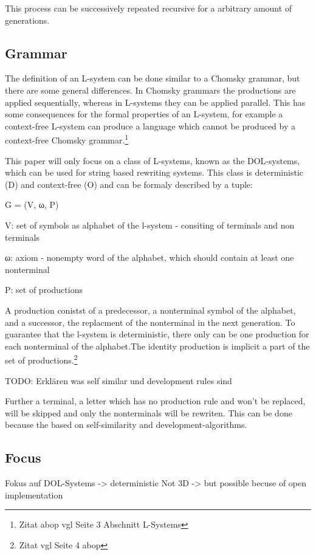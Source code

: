 \documentclass[english]{cpp-hmwk}
\begin{document}
This process can be successively repeated recursive for a arbitrary amount of generations.
\subsection{Grammar}
\label{section:grammar}
The definition of an L-system can be done similar to a Chomsky grammar, but there are some general differences. In Chomsky grammars the productions are applied sequentially, whereas in L-systems they can be applied parallel. This has some consequences for the formal properties of an L-system, for example a context-free L-system can produce a language which cannot be produced by a context-free Chomsky grammar.\footnote{Zitat abop vgl Seite 3  Abschnitt L-Systems}

\noindent This paper will only focus on a class of L-systems, known as the DOL-systems, which can be used for string based rewriting systems. This class is deterministic (D) and context-free (O) and can be formaly described  by a tuple:

\begin{center}
G = (V, ω, P)
\end{center}

V: set of symbols as alphabet of the l-system - consiting of terminals and non terminals

ω: axiom - nonempty word of the alphabet, which should contain at least one nonterminal

P: set of productions

\medskip
\noindent A production conistst of a predecessor, a nonterminal symbol of the alphabet, and a successor, the replacment of the nonterminal in the next generation.
To guarantee that the l-system is deterministic, there only can be one production for each nonterminal of the alphabet.The identity production is implicit a part of the set of productions.\footnote{Zitat vgl Seite 4 abop}

\bigskip

TODO: Erklären was self similar und development rules sind



 Further a terminal, a letter which has no production rule and won't be replaced, will be skipped and only the nonterminals will be rewriten.
This can be done because the  based on self-similarity and development-algorithms.


\subsection{Focus}
Fokus auf DOL-Systems -> deterministic
Not 3D -> but possible becuse of open implementation
\end{document}
